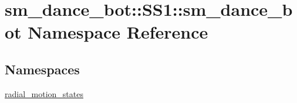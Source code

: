 \hypertarget{namespacesm__dance__bot_1_1SS1_1_1sm__dance__bot}{}\section{sm\+\_\+dance\+\_\+bot\+:\+:S\+S1\+:\+:sm\+\_\+dance\+\_\+bot Namespace Reference}
\label{namespacesm__dance__bot_1_1SS1_1_1sm__dance__bot}
\subsection*{Namespaces}
\begin{DoxyCompactItemize}
\item 
 \hyperlink{namespacesm__dance__bot_1_1SS1_1_1sm__dance__bot_1_1radial__motion__states}{radial\+\_\+motion\+\_\+states}
\end{DoxyCompactItemize}
